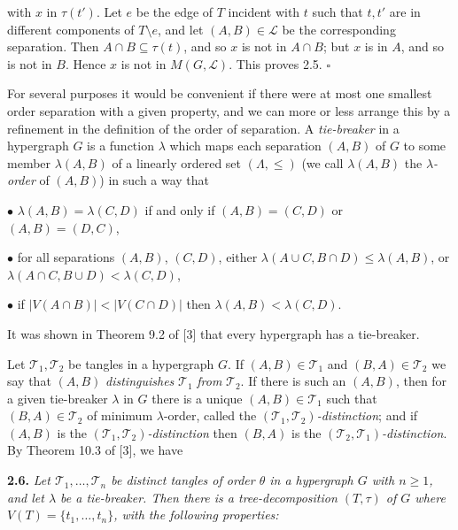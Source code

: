 \noindent with $x$ in $\tau(t')$. Let $e$ be the edge of $T$ incident with $t$ such that $t, t'$ are in different components of $T \setminus e$, and let $(A, B) \in \mathscr{L}$ be the corresponding separation. Then $A \cap B \subseteq \tau(t)$, and so $x$ is not in $A \cap B$; but $x$ is in $A$, and so is not in $B$. Hence $x$ is not in $M(G, \mathscr{L})$. This proves 2.5. $\square$

For several purposes it would be convenient if there were at most one smallest order separation with a given property, and we can more or less arrange this by a refinement in the definition of the order of separation. A \textit{tie-breaker} in a hypergraph $G$ is a function $\lambda$ which maps each separation $(A, B)$ of $G$ to some member $\lambda(A, B)$ of a linearly ordered set $(\Lambda, \le)$ (we call $\lambda(A, B)$ the \textit{$\lambda$-order} of $(A, B)$) in such a way that

\hspace*{12pt}$\bullet$ $\lambda(A, B) = \lambda(C, D)$ if and only if $(A, B) = (C, D)$ or $(A, B) = (D, C)$,

\hspace*{12pt}$\bullet$ for all separations $(A, B)$, $(C, D)$, either $\lambda(A \cup C, B \cap D) \le \lambda(A, B)$, or $\lambda(A \cap C, B \cup D) < \lambda(C, D)$,

\hspace*{12pt}$\bullet$ if $|V(A \cap B)| < |V(C \cap D)|$ then $\lambda(A, B) < \lambda(C, D)$.

It was shown in Theorem 9.2 of [3] that every hypergraph has a tie-breaker.

Let $\mathscr{T}_1, \mathscr{T}_2$ be tangles in a hypergraph $G$. If $(A, B) \in \mathscr{T}_1$ and $(B, A) \in \mathscr{T}_2$ we say that $(A, B)$ \textit{distinguishes} $\mathscr{T}_1$ \textit{from} $\mathscr{T}_2$. If there is such an $(A, B)$, then for a given tie-breaker $\lambda$ in $G$ there is a unique $(A, B) \in \mathscr{T}_1$ such that $(B, A) \in \mathscr{T}_2$ of minimum $\lambda$-order, called the \textit{$(\mathscr{T}_1, \mathscr{T}_2)$-distinction}; and if $(A, B)$ is the \textit{$(\mathscr{T}_1, \mathscr{T}_2)$-distinction} then $(B, A)$ is the \textit{$(\mathscr{T}_2, \mathscr{T}_1)$-distinction}. By Theorem 10.3 of [3], we have

\textbf{2.6.} \textit{Let $\mathscr{T}_1, \dots, \mathscr{T}_n$ be distinct tangles of order $\theta$ in a hypergraph $G$ with $n \ge 1$, and let $\lambda$ be a tie-breaker. Then there is a tree-decomposition $(T, \tau)$ of $G$ where $V(T) = \{t_1, \dots, t_n\}$, with the following properties:}

